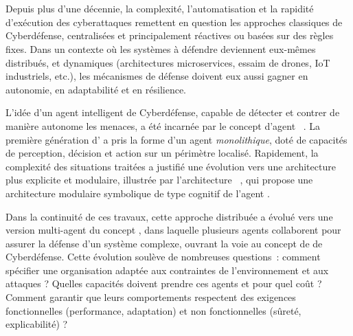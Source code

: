 \clearpage
\thispagestyle{empty}
\null
\newpage

\cleardoublepage
{}
\cleardoublepage
{}

\

\vspace{1em}

\bigskip

\\

\noindent
Depuis plus d'une décennie, la complexité, l'automatisation et la rapidité d'exécution des cyberattaques remettent en question les approches classiques de Cyberdéfense, centralisées et principalement réactives ou basées sur des règles fixes. Dans un contexte où les systèmes à défendre deviennent eux-mêmes distribués, et dynamiques (architectures microservices, essaim de drones, IoT industriels, etc.), les mécanismes de défense doivent eux aussi gagner en autonomie, en adaptabilité et en résilience.

L'idée d'un agent intelligent de Cyberdéfense, capable de détecter et contrer de manière autonome les menaces, a été incarnée par le concept d'agent ~\cite{Kott2023}. La première génération d' a pris la forme d'un agent \textit{monolithique}, doté de capacités de perception, décision et action sur un périmètre localisé. Rapidement, la complexité des situations traitées a justifié une évolution vers une architecture plus explicite et modulaire, illustrée par l'architecture ~\cite{Kott2023}, qui propose une architecture modulaire symbolique de type cognitif de l'agent .

Dans la continuité de ces travaux, cette approche distribuée a évolué vers une version multi-agent du concept , dans laquelle plusieurs agents collaborent pour assurer la défense d'un système complexe, ouvrant la voie au concept de  de Cyberdéfense. Cette évolution soulève de nombreuses questions~: comment spécifier une organisation adaptée aux contraintes de l'environnement et aux attaques ? Quelles capacités doivent prendre ces agents et pour quel coût ? Comment garantir que leurs comportements respectent des exigences fonctionnelles (performance, adaptation) et non fonctionnelles (sûreté, explicabilité) ?

